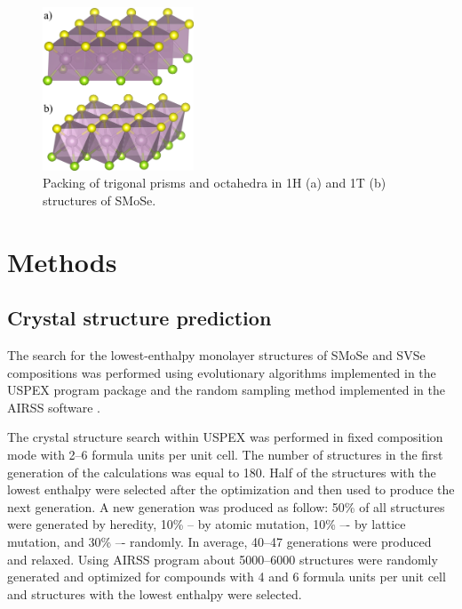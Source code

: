 \documentclass[a4paperm]{article}
\begin{document}
\begin{figure}[H]
        \includegraphics[width=0.4\textwidth]{1H1T.png}
        \caption{Packing of trigonal prisms and octahedra in 1H (a) and 1T (b) structures of SMoSe.}
\label{1H1T}
\end{figure}





		\section{Methods}

\subsection*{Crystal structure prediction}


The search for the lowest-enthalpy monolayer structures of SMoSe and SVSe compositions was performed using evolutionary algorithms implemented in the USPEX program package \cite{uspex1,uspex2,uspex3} and the random sampling method implemented in the AIRSS software \cite{airss1,airss2}.

The crystal structure search within USPEX was performed in fixed composition mode with 2--6 formula units per unit cell.
The number of structures in the first generation of the calculations was equal to 180.
Half of the structures with the lowest enthalpy were selected after the optimization and then used to produce the next generation.
A new generation was produced as follow: 50\% of all structures were generated by heredity, 10\% -- by atomic mutation, 10\% –- by lattice mutation, and 30\% –- randomly.
In average, 40--47 generations were produced and relaxed.
Using AIRSS program about 5000--6000 structures were randomly generated and optimized for compounds with 4 and 6 formula units per unit cell and structures with the lowest enthalpy were selected.
\end{document}
